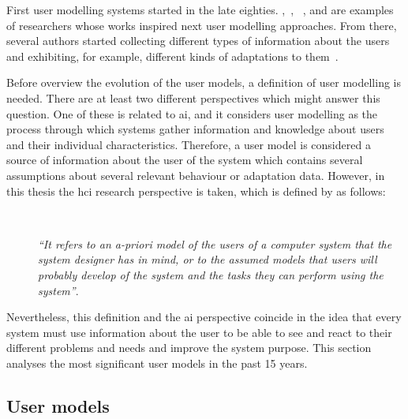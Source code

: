 First user modelling systems started in the late eighties. 
\citet{allen_plan_based_1979},~\citet{cohen_elements_1979}, 
~\citet{perrault_speech_1978}, and \citet{rich_building_1979}\citep{rich_user_1979} 
are examples of researchers whose works inspired next user modelling approaches. 
From there, several authors started collecting different types of information 
about the users and exhibiting, for example, different kinds of adaptations to 
them~\citep{kobsa_generic_2001}.

Before overview the evolution of the user models, a definition of user modelling 
is needed. There are at least two different perspectives which might answer this 
question. One of these is related to \ac{ai}, and it considers user modelling 
as the process through which systems gather information and knowledge about 
users and their individual characteristics. Therefore, a user model is considered 
a source of information about the user of the system which contains several
assumptions about several relevant behaviour or adaptation data. However, in
this thesis the \ac{hci} research perspective is taken, which is defined by
\citet{pohl_logic_based_1999} as follows:

\begin{description}
  \item[] \hfill \\
  \begin{mdframed}[hidealllines=true,backgroundcolor=gray!20]
  \textit{``It refers to an a-priori model of the users of a computer system that the system
  designer has in mind, or to the assumed models that users will probably develop
  of the system and the tasks they can perform using the system''}.
  \end{mdframed}
\end{description}

Nevertheless, this definition and the \ac{ai} perspective coincide in the idea that 
every system must use information about the user to be able to see and react to 
their different problems and needs and improve the system purpose. This section 
analyses the most significant user models in the past 15 years.

\subsection{User models}
\label{sec:user_models}


















